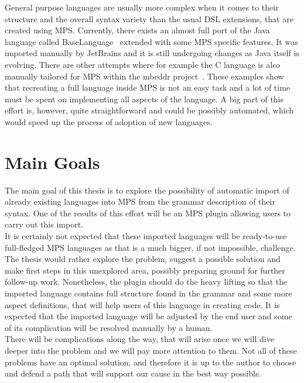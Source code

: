 General purpose languages are usually more complex when it comes to their structure and the overall syntax variety than the usual DSL extensions, that are created using MPS.
Currently, there exists an almost full port of the Java language called BaseLanguage~\cite{BaseLanguage} extended with some MPS specific features.
It was imported manually by JetBrains and it is still undergoing changes as Java itself is evolving.
There are other attempts where for example the C language is also manually tailored for MPS within the mbeddr project~\cite{mbeddr}.
These examples show that recreating a full language inside MPS is not an easy task and a lot of time must be spent on implementing all aspects of the language.
A big part of this effort is, however, quite straightforward and could be possibly automated, which would speed up the process of adoption of new languages.

\section{Main Goals}
\label{chap:main_goals}

The main goal of this thesis is to explore the possibility of automatic import of already existing languages into MPS from the grammar description of their syntax.
One of the results of this effort will be an MPS plugin allowing users to carry out this import.
\\

It is certainly not expected that these imported languages will be ready-to-use full-fledged MPS languages as that is a much bigger, if not impossible, challenge.
The thesis would rather explore the problem, suggest a possible solution and make first steps in this unexplored area, possibly preparing ground for further follow-up work.
Nonetheless, the plugin should do the heavy lifting so that the imported language contains full structure found in the grammar and some more aspect definitions, that will help users of this language in creating code.
It is expected that the imported language will be adjusted by the end user and some of its complication will be resolved manually by a human.
\\

There will be complications along the way, that will arise once we will dive deeper into the problem and we will pay more attention to them.
Not all of these problems have an optimal solution, and therefore it is up to the author to choose and defend a path that will support our cause in the best way possible.
\\

